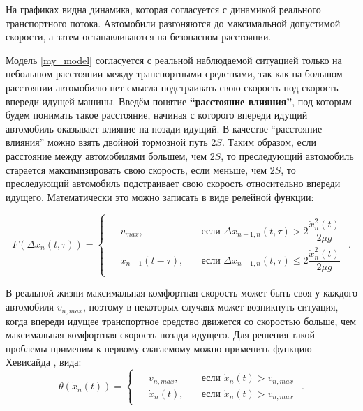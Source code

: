 \documentclass[12pt, a4paper]{extarticle}
\numberwithin{equation}{section}
\numberwithin{figure}{section}
\begin{document}
На графиках видна динамика, которая согласуется с динамикой реального транспортного потока. Автомобили разгоняются до максимальной допустимой скорости, а затем останавливаются на безопасном расстоянии. 

Модель \eqref{my_model} согласуется с реальной наблюдаемой ситуацией только на небольшом расстоянии между транспортными средствами, так как на большом расстоянии автомобилю нет смысла подстраивать свою скорость под скорость впереди идущей машины. Введём понятие \textbf{``расстояние влияния''}, под которым будем понимать такое расстояние, начиная с которого впереди идущий автомобиль оказывает влияние на позади идущий. В качестве ``расстояние влияния'' можно взять двойной тормозной путь $2S$. Таким образом, если расстояние между автомобилями большем, чем  $2S$, то преследующий автомобиль старается максимизировать свою скорость, если меньше, чем  $2S$, то преследующий автомобиль подстраивает свою скорость относительно впереди идущего. Математически это можно записать в виде релейной функции:

\begin{equation*}
F(\Delta x_{n}(t,\tau))=
\begin{cases}
\begin{split}
&v_{max},\quad &\text{если }\Delta x_{n-1,n}(t,\tau) > 2\dfrac{\dot{x}_n^2(t)}{2\mu g} \\
&\dot{x}_{n-1}(t-\tau),\quad &\text{если }\Delta x_{n-1,n}(t,\tau) \leq 2\dfrac{\dot{x}_n^2(t)}{2\mu g}
\end{split}
\end{cases}.
\end{equation*}

В реальной жизни максимальная комфортная скорость может быть своя у каждого автомобиля $v_{n,max}$, поэтому в некоторых случаях может возникнуть ситуация, когда впереди идущее транспортное средство движется со скоростью больше, чем максимальная комфортная скорость позади идущего. Для решения такой проблемы применим к первому слагаемому можно применить функцию Хевисайда \cite{Heaviside_function}, вида:
\begin{equation*}
\theta(\dot{x}_n(t))=
\begin{cases}
\begin{split}
&v_{n,max},\quad &\text{если }\dot{x}_n(t)>v_{n,max} \\
&\dot{x}_n(t),\quad &\text{если }\dot{x}_n(t)>v_{n,max}
\end{split}
\end{cases}.
\end{equation*}
\end{document}
